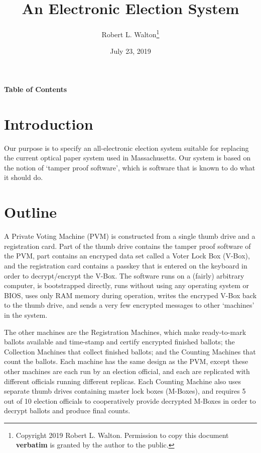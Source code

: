 \documentclass[12pt]{article}
\makeatletter
\renewcommand\tableofcontents{%
    \begin{list}{}%
	     {\setlength{\itemsep}{0in}%
	      \setlength{\topsep}{0in}%
	      \setlength{\parsep}{1ex}%
	      \setlength{\labelwidth}{0in}%
	      \setlength{\baselineskip}{1.5ex}%
	      \setlength{\leftmargin}{0.8in}%
	      \setlength{\rightmargin}{0.8in}}%
    \item\@starttoc{toc}%
    \end{list}}
\makeatother
\begin{document}
        
\title{An Electronic Election System}

\author{Robert L. Walton\thanks{Copyright 2019 Robert L. Walton.
Permission to copy this document {\bf verbatim} is granted by the author
to the public.}}

\date{July 23, 2019}

\maketitle

\begin{center}
\large \bf Table of Contents
\end{center}

\bigskip

\tableofcontents 

\newpage

\section{Introduction}

Our purpose is to specify an all-electronic election system
suitable for replacing the current optical paper system
used in Massachusetts.  Our system is based on the notion
of `tamper proof software', which is software that is
known to do what it should do.

\section{Outline}

A Private Voting Machine
(PVM) is constructed from a single thumb drive and a
registration card.  Part of the thumb drive contains the
tamper proof software of the PVM, part contains an encryped
data set called a Voter Lock Box (V-Box), and the registration
card contains a passkey that is entered on the keyboard in
order to decrypt/encrypt the V-Box.  The software runs on
a (fairly) arbitrary computer, is bootstrapped directly,
runs without using any operating system or BIOS,
uses only RAM memory during operation,
writes the encryped V-Box back to the thumb drive, and sends
a very few encrypted messages to other `machines' in the
system.

The other machines are the Registration Machines, which make
ready-to-mark ballots available and time-stamp and certify
encrypted finished ballots; the Collection Machines that collect
finished ballots; and the Counting Machines that count the
ballots.  Each machine has the same design as the PVM, except
these other machines are each run by an election official, and
each are replicated with different officials running different
replicas.  Each Counting Machine also uses separate
thumb drives containing master lock boxes
(M-Boxes), and requires 5 out of 10 election officials to cooperatively
provide decrypted M-Boxes in order to decrypt ballots and
produce final counts.
\end{document}
